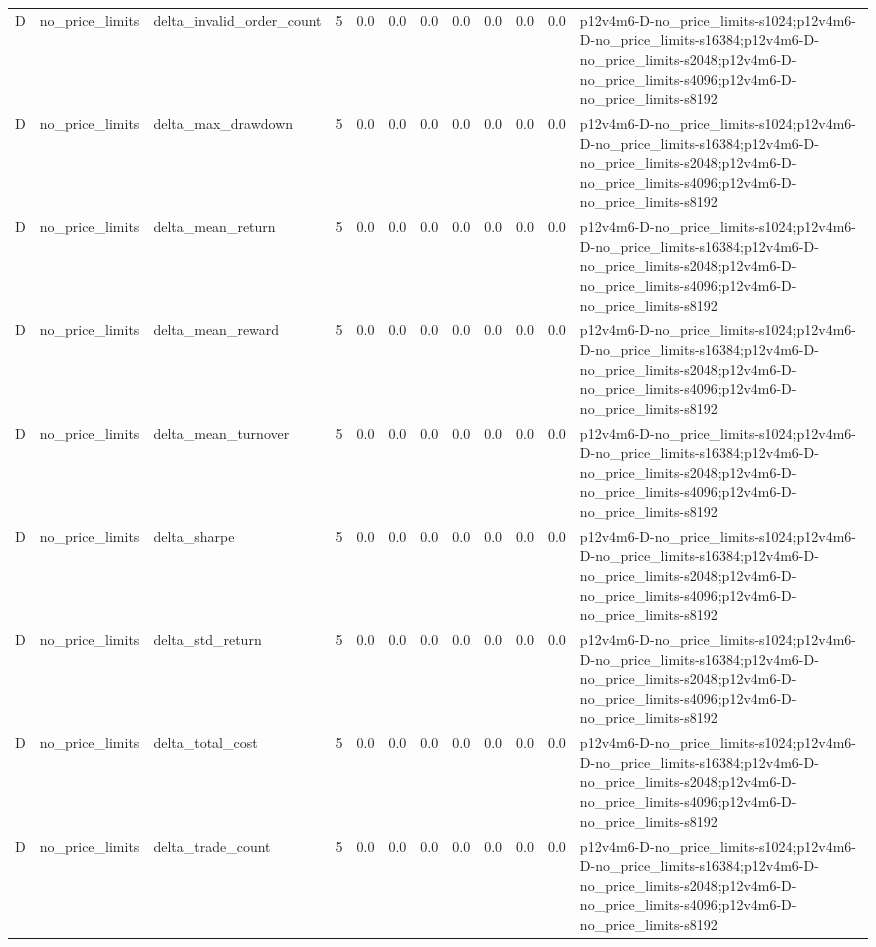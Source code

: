\begin{tabular}{llllllllllll}
D & no\_price\_limits & delta\_invalid\_order\_count & 5 & 0.0 & 0.0 & 0.0 & 0.0 & 0.0 & 0.0 & 0.0 & p12v4m6-D-no\_price\_limits-s1024;p12v4m6-D-no\_price\_limits-s16384;p12v4m6-D-no\_price\_limits-s2048;p12v4m6-D-no\_price\_limits-s4096;p12v4m6-D-no\_price\_limits-s8192 \\
D & no\_price\_limits & delta\_max\_drawdown & 5 & 0.0 & 0.0 & 0.0 & 0.0 & 0.0 & 0.0 & 0.0 & p12v4m6-D-no\_price\_limits-s1024;p12v4m6-D-no\_price\_limits-s16384;p12v4m6-D-no\_price\_limits-s2048;p12v4m6-D-no\_price\_limits-s4096;p12v4m6-D-no\_price\_limits-s8192 \\
D & no\_price\_limits & delta\_mean\_return & 5 & 0.0 & 0.0 & 0.0 & 0.0 & 0.0 & 0.0 & 0.0 & p12v4m6-D-no\_price\_limits-s1024;p12v4m6-D-no\_price\_limits-s16384;p12v4m6-D-no\_price\_limits-s2048;p12v4m6-D-no\_price\_limits-s4096;p12v4m6-D-no\_price\_limits-s8192 \\
D & no\_price\_limits & delta\_mean\_reward & 5 & 0.0 & 0.0 & 0.0 & 0.0 & 0.0 & 0.0 & 0.0 & p12v4m6-D-no\_price\_limits-s1024;p12v4m6-D-no\_price\_limits-s16384;p12v4m6-D-no\_price\_limits-s2048;p12v4m6-D-no\_price\_limits-s4096;p12v4m6-D-no\_price\_limits-s8192 \\
D & no\_price\_limits & delta\_mean\_turnover & 5 & 0.0 & 0.0 & 0.0 & 0.0 & 0.0 & 0.0 & 0.0 & p12v4m6-D-no\_price\_limits-s1024;p12v4m6-D-no\_price\_limits-s16384;p12v4m6-D-no\_price\_limits-s2048;p12v4m6-D-no\_price\_limits-s4096;p12v4m6-D-no\_price\_limits-s8192 \\
D & no\_price\_limits & delta\_sharpe & 5 & 0.0 & 0.0 & 0.0 & 0.0 & 0.0 & 0.0 & 0.0 & p12v4m6-D-no\_price\_limits-s1024;p12v4m6-D-no\_price\_limits-s16384;p12v4m6-D-no\_price\_limits-s2048;p12v4m6-D-no\_price\_limits-s4096;p12v4m6-D-no\_price\_limits-s8192 \\
D & no\_price\_limits & delta\_std\_return & 5 & 0.0 & 0.0 & 0.0 & 0.0 & 0.0 & 0.0 & 0.0 & p12v4m6-D-no\_price\_limits-s1024;p12v4m6-D-no\_price\_limits-s16384;p12v4m6-D-no\_price\_limits-s2048;p12v4m6-D-no\_price\_limits-s4096;p12v4m6-D-no\_price\_limits-s8192 \\
D & no\_price\_limits & delta\_total\_cost & 5 & 0.0 & 0.0 & 0.0 & 0.0 & 0.0 & 0.0 & 0.0 & p12v4m6-D-no\_price\_limits-s1024;p12v4m6-D-no\_price\_limits-s16384;p12v4m6-D-no\_price\_limits-s2048;p12v4m6-D-no\_price\_limits-s4096;p12v4m6-D-no\_price\_limits-s8192 \\
D & no\_price\_limits & delta\_trade\_count & 5 & 0.0 & 0.0 & 0.0 & 0.0 & 0.0 & 0.0 & 0.0 & p12v4m6-D-no\_price\_limits-s1024;p12v4m6-D-no\_price\_limits-s16384;p12v4m6-D-no\_price\_limits-s2048;p12v4m6-D-no\_price\_limits-s4096;p12v4m6-D-no\_price\_limits-s8192 \\

\end{tabular}
